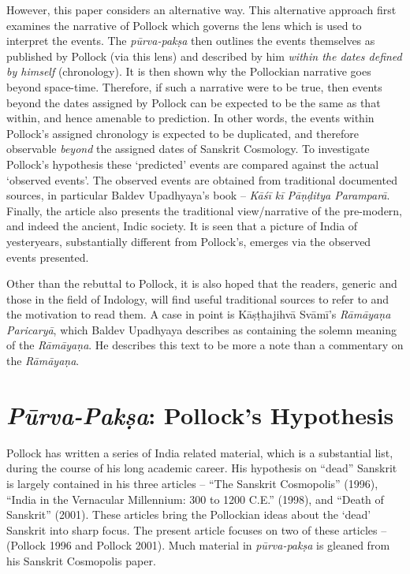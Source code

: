 However, this paper considers an alternative way. This alternative approach first examines the narrative of Pollock which governs the lens which is used to interpret the events. The \textit{pūrva-pakṣa} then outlines the events themselves as published by Pollock (via this lens) and described by him \textit{within the dates defined by himself} (chronology). It is then shown why the Pollockian narrative goes beyond space-time. Therefore, if such a narrative were to be true, then events beyond the dates assigned by Pollock can be expected to be the same as that within, and hence amenable to prediction. In other words, the events within Pollock’s assigned chronology is expected to be duplicated, and therefore observable \textit{beyond} the assigned dates of Sanskrit Cosmology. To investigate Pollock’s hypothesis these ‘predicted’ events are compared against the actual ‘observed events’. The observed events are obtained from traditional documented sources, in particular Baldev Upadhyaya’s book – \textit{Kāśī kī Pāṇḍitya Paramparā}. Finally, the article also presents the traditional view/narrative of the pre-modern, and indeed the ancient, Indic society. It is seen that a picture of India of yesteryears, substantially different from Pollock’s, emerges via the observed events presented.

Other than the rebuttal to Pollock, it is also hoped that the readers, generic and those in the field of Indology, will find useful traditional sources to refer to and the motivation to read them. A case in point is Kāṣṭhajihvā Svāmī’s \textit{Rāmāyaṇa Paricaryā}, which Baldev Upadhyaya describes as containing the solemn meaning of the \textit{Rāmāyaṇa}. He describes this text to be more a note than a commentary on the \textit{Rāmāyaṇa}.

\vspace{-0.5cm}

\section*{\textit{Pūrva-Pakṣa}: Pollock’s Hypothesis}

Pollock has written a series of India related material, which is a substantial list, during the course of his long academic career. His hypothesis on “dead” Sanskrit is largely contained in his three articles – “The Sanskrit Cosmopolis” (1996), “India in the Vernacular Millennium: 300 to 1200 C.E.” (1998), and “Death of Sanskrit” (2001). These articles bring the Pollockian ideas about the ‘dead’ Sanskrit into sharp focus. The present article focuses on two of these articles – (Pollock 1996 and Pollock 2001). Much material in \textit{pūrva-pakṣa} is gleaned from his Sanskrit Cosmopolis paper.

